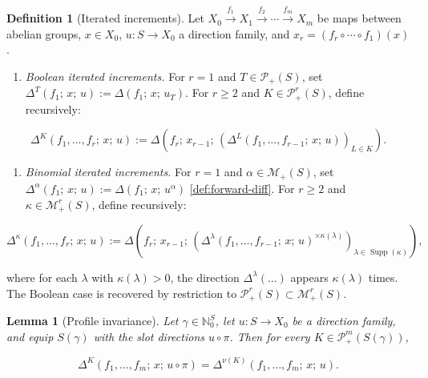 \documentclass[10pt,a4paper]{article}
\theoremstyle{plain}
\newtheorem{lemma}[theorem]{Lemma}
\theoremstyle{definition}
\newtheorem{definition}[theorem]{Definition}
\newcommand{\IN}{\mathbb{N}} %
\newcommand{\1}{\mathbb{1}} %
\newcommand{\KP}{\mathcal{P}}
\newcommand{\tightlist}{\setlength{\itemsep}{0pt}\setlength{\parskip}{0pt}}
\newcommand{\KM}{\mathcal{M}} %
\DeclareMathOperator{\supp}{\mathrm{Supp}} %
\begin{document}
\begin{definition}[Iterated increments]

\label{def:iterated-incr} Let
\(X_0 \xrightarrow{f_1} X_1 \xrightarrow{f_2} \cdots \xrightarrow{f_m} X_m\)
be maps between abelian groups, \(x \in X_0\), \(u: S \to X_0\) a
direction family, and \(x_r = (f_r \circ \cdots \circ f_1)(x)\).

\begin{enumerate}
\def\labelenumi{\arabic{enumi})}
\tightlist
\item
  \emph{Boolean iterated increments.} For \(r = 1\) and
  \(T \in \KP_+(S)\), set
  \(\Delta^{T}(f_1;\, x;\, u) := \Delta(f_1;\, x;\, u_T)\). For
  \(r \geq 2\) and \(K \in \KP_+^{r}(S)\), define recursively:
\end{enumerate}

\[
  \Delta^{K}(f_1, \dots, f_r;\, x;\, u)
  :=
  \Delta(f_r;\, x_{r-1};\,
  (\Delta^{L}(f_1, \dots, f_{r-1};\, x;\, u))_{L \in K}).
\]

\begin{enumerate}
\def\labelenumi{\arabic{enumi})}
\setcounter{enumi}{1}
\tightlist
\item
  \emph{Binomial iterated increments.} For \(r = 1\) and
  \(\alpha \in \KM_+(S)\), set
  \(\Delta^{\alpha}(f_1;\, x;\, u) := \Delta(f_1;\, x;\, u^{\alpha})\)
  \ref{def:forward-diff}. For \(r \geq 2\) and
  \(\kappa \in \KM_+^{r}(S)\), define recursively:
\end{enumerate}

\[
  \Delta^{\kappa}(f_1, \dots, f_r;\, x;\, u)
  :=
  \Delta(f_r;\, x_{r-1};\,
  (\Delta^{\lambda}(f_1, \dots, f_{r-1};\, x;\, u)^{\times \kappa(\lambda)})_{\lambda \in \supp(\kappa)}),
\]

where for each \(\lambda\) with \(\kappa(\lambda) > 0\), the direction
\(\Delta^{\lambda}(\dots)\) appears \(\kappa(\lambda)\) times. The
Boolean case is recovered by restriction to
\(\KP_+^r(S) \subset \KM_+^r(S)\).

\end{definition}

\begin{lemma}[Profile invariance]

\label{lem:profile-invariance} Let \(\gamma \in \IN_0^S\), let
\(u: S \to X_0\) be a direction family, and equip \(S(\gamma)\) with the
slot directions \(u \circ \pi\). Then for every
\(K \in \KP_+^m(S(\gamma))\),

\[
  \Delta^K(f_1, \dots, f_m;\, x;\, u \circ \pi) = \Delta^{\nu(K)}(f_1, \dots, f_m;\, x;\, u).
\]

\end{lemma}
\end{document}
